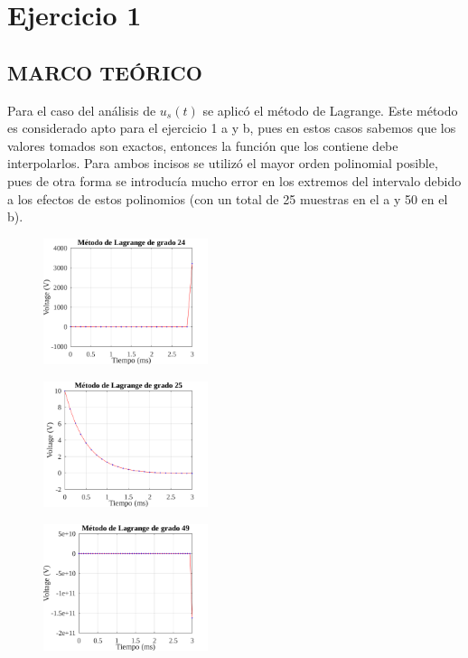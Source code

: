 \documentclass[letterpaper, 10 pt, conference]{ieeeconf}  %
\begin{document}
\section{Ejercicio 1}

\subsection{MARCO TE\'ORICO}

    Para el caso del an\'alisis de $u_{s}(t)$ se aplic\'o el m\'etodo de Lagrange. Este m\'etodo es considerado apto para el ejercicio 1 a y b, pues en estos casos sabemos que los valores tomados son exactos, entonces la funci\'on que los contiene debe interpolarlos.
    Para ambos incisos se utiliz\'o el mayor orden polinomial posible, pues de otra forma se introduc\'ia mucho error en los extremos del intervalo debido a los efectos de estos polinomios (con un total de 25 muestras en el a y 50 en el b). 

    \begin{figure}[H]
    \centering
    \includegraphics[width=0.43\textwidth]{./../plots/ej1/ej1-a-con-error.png}
    \label{fig:fig}
    \end{figure}

    \begin{figure}[H]
    \centering
    \includegraphics[width=0.43\textwidth]{./../plots/ej1/ej1-a.png}
    \label{fig:fig}
    \end{figure}

    \begin{figure}[H]
    \centering
    \includegraphics[width=0.43\textwidth]{./../plots/ej1/ej1-con-error.png}
    \label{fig:fig}
    \end{figure}
\end{document}
